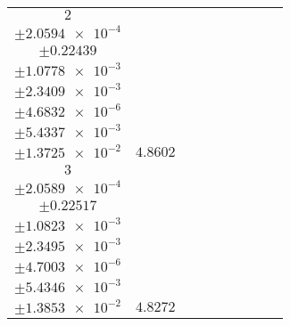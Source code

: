 \documentclass[8pt]{article}
\begin{document}
\begin{longtable}[l]{c c c c c c c c c}
$\num{2}$ & \begin{tabular}[c]{@{}c@{}}$\num{6.2469e-2}$ \\ $\pm\num{2.0594e-4}$\end{tabular} & \begin{tabular}[c]{@{}c@{}}$\num{-2.1802}$ \\ $\pm\num{0.22439}$\end{tabular} & \begin{tabular}[c]{@{}c@{}}$\num{-3.4424}$ \\ $\pm\num{1.0778e-3}$\end{tabular} & \begin{tabular}[c]{@{}c@{}}$\num{4.0417e+3}$ \\ $\pm\num{2.3409e-3}$\end{tabular} & \begin{tabular}[c]{@{}c@{}}$\num{8.0857}$ \\ $\pm\num{4.6832e-6}$\end{tabular} & \begin{tabular}[c]{@{}c@{}}$\num{1.6651}$ \\ $\pm\num{5.4337e-3}$\end{tabular} & \begin{tabular}[c]{@{}c@{}}$\num{4.417}$ \\ $\pm\num{1.3725e-2}$\end{tabular} & $\num{4.8602}$\\
$\num{3}$ & \begin{tabular}[c]{@{}c@{}}$\num{6.2197e-2}$ \\ $\pm\num{2.0589e-4}$\end{tabular} & \begin{tabular}[c]{@{}c@{}}$\num{1.6206}$ \\ $\pm\num{0.22517}$\end{tabular} & \begin{tabular}[c]{@{}c@{}}$\num{3.4445}$ \\ $\pm\num{1.0823e-3}$\end{tabular} & \begin{tabular}[c]{@{}c@{}}$\num{4.0486e+3}$ \\ $\pm\num{2.3495e-3}$\end{tabular} & \begin{tabular}[c]{@{}c@{}}$\num{8.0994}$ \\ $\pm\num{4.7003e-6}$\end{tabular} & \begin{tabular}[c]{@{}c@{}}$\num{1.661}$ \\ $\pm\num{5.4346e-3}$\end{tabular} & \begin{tabular}[c]{@{}c@{}}$\num{4.4283}$ \\ $\pm\num{1.3853e-2}$\end{tabular} & $\num{4.8272}$\\

\end{longtable}
\end{document}
